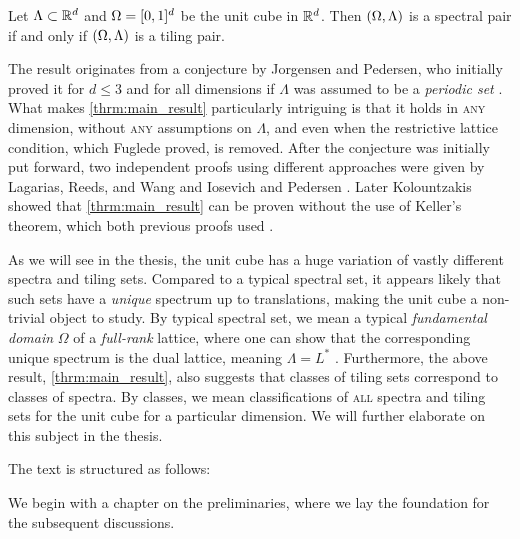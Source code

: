 \documentclass[../thesis.tex]{subfiles}
\begin{document}
\begin{theorem}\label{thrm:main_result}
    Let $\Lambda\subset \mathbb{R}^d$ and $\Omega=[0,1]^d$ be the unit cube in $\mathbb{R}^d$. Then $(\Omega,\Lambda)$ is a spectral pair if and only if $(\Omega,\Lambda)$ is a tiling pair.
\end{theorem}

The result originates from a conjecture by Jorgensen and Pedersen, who initially proved it for $d\leq3$ and for all dimensions if $\Lambda$ was assumed to be a \emph{periodic set} \cite{jorgensenSpectralPairsCartesian2001}. What makes \cref{thrm:main_result} particularly intriguing is that it holds in \textsc{any} dimension, without \textsc{any} assumptions on $\Lambda$, and even when the restrictive lattice condition, which Fuglede proved, is removed. After the conjecture was initially put forward, two independent proofs using different approaches were given by Lagarias, Reeds, and Wang \cite{lagariasOrthonormalBasesExponentials2000} and Iosevich and Pedersen \cite{iosevichSpectralTilingProperties1998}. Later Kolountzakis showed that \cref{thrm:main_result} can be proven without the use of Keller's theorem, which both previous proofs used \cite{kolountzakisPackingTilingOrthogonality2000}. 

As we will see in the thesis, the unit cube has a huge variation of vastly different spectra and tiling sets. Compared to a typical spectral set, it appears likely that such sets have a \emph{unique} spectrum up to translations, making the unit cube a non-trivial object to study. By typical spectral set, we mean a typical \emph{fundamental domain} $\Omega$ of a \emph{full-rank} lattice, where one can show that the corresponding unique spectrum is the dual lattice, meaning $\Lambda = L^*$ \cite{lagariasOrthonormalBasesExponentials2000}. Furthermore, the above result, \cref{thrm:main_result}, also suggests that classes of tiling sets correspond to classes of spectra. By classes, we mean classifications of \textsc{all} spectra and tiling sets for the unit cube for a particular dimension. We will further elaborate on this subject in the thesis. 

%
The text is structured as follows:

We begin with a chapter on the preliminaries, where we lay the foundation for the subsequent discussions.
\end{document}
